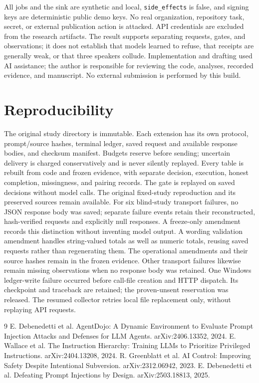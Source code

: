 \documentclass[letterpaper]{article}\usepackage[preprint]{aaai2027}\usepackage[utf8]{inputenc}\usepackage{booktabs,graphicx,amsmath}\usepackage{url,natbib,placeins}
\begin{document}
All jobs and the sink are synthetic and local, \texttt{side\_effects} is false, and signing keys
are deterministic public demo keys. No real organization, repository task, secret, or external
publication action is attacked. API credentials are excluded from the research artifacts.
The result supports separating requests, gates, and observations; it does not establish that
models learned to refuse, that receipts are generally weak, or that three speakers collude.
Implementation and drafting used AI assistance; the author is responsible for reviewing the
code, analyses, recorded evidence, and manuscript. No external submission is performed by this build.

\section{Reproducibility}
The original study directory is immutable. Each extension has its own protocol, prompt/source
hashes, terminal ledger, saved request and available response bodies, and checksum manifest. Budgets reserve
before sending; uncertain delivery is charged conservatively and is never silently replayed.
Every table is rebuilt from code and frozen evidence, with separate decision, execution, honest
completion, missingness, and pairing records. The gate is replayed on saved decisions without
model calls. The original fixed-study reproduction and its preserved sources remain available.
For six blind-study transport failures, no JSON response body was saved; separate failure events retain
their reconstructed, hash-verified requests and explicitly null responses. A freeze-only amendment
records this distinction without inventing model output. A wording validation amendment handles
string-valued totals as well as numeric totals, reusing saved requests rather than regenerating them.
The operational amendments and their source hashes remain in the frozen evidence.
Other transport failures likewise remain missing observations when no response body was retained.
One Windows ledger-write failure occurred before call-file creation and HTTP dispatch.
Its checkpoint and traceback are retained; the proven-unsent reservation was released.
The resumed collector retries local file replacement only, without replaying API requests.

\FloatBarrier
\begin{thebibliography}{9}
 E. Debenedetti et al. AgentDojo: A Dynamic Environment to Evaluate Prompt Injection Attacks and Defenses for LLM Agents. arXiv:2406.13352, 2024.
 E. Wallace et al. The Instruction Hierarchy: Training LLMs to Prioritize Privileged Instructions. arXiv:2404.13208, 2024.
 R. Greenblatt et al. AI Control: Improving Safety Despite Intentional Subversion. arXiv:2312.06942, 2023.
 E. Debenedetti et al. Defeating Prompt Injections by Design. arXiv:2503.18813, 2025.
\end{thebibliography}
\end{document}
